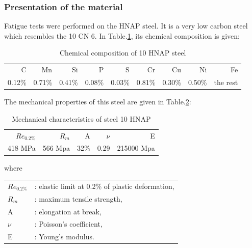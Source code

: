 \documentclass[3p,times,number,review]{elsarticle}
\begin{document}
\subsubsection{Presentation of the material}
Fatigue tests were performed on the HNAP steel. It is a very low carbon steel
which resembles the 10 CN 6. In Table.\ref{tab.10HNAPchem}, its chemical composition is given:	
\begin{table}[!h]
\centering
\begin{tabular}{rrrrrrrrr}
\hline
C      & Mn     & Si     & P      & S      & Cr     & Cu     & Ni     & Fe       \\
0.12\% & 0.71\% & 0.41\% & 0.08\% & 0.03\% & 0.81\% & 0.30\% & 0.50\% & the rest \\ \hline
\end{tabular}
\caption{Chemical composition of 10 HNAP steel\cite{Bedkowski1994}}
\label{tab.10HNAPchem}
\end{table}
The mechanical properties of this steel are given in Table.\ref{tab.10HNAPmec}:
\begin{table}[!h]
\centering
\begin{tabular}{rrrrr}
\hline
$Re_{0.2\%}$ & $R_m$   & A    & $\nu$ & E          \\
418 MPa     & 566 Mpa & 32\% & 0.29  & 215000 Mpa \\ \hline
\end{tabular}
\caption{Mechanical characteristics of steel 10 HNAP\cite{Bedkowski_1994}}
\label{tab.10HNAPmec}
\end{table}

where 
\begin{table}[!h]
\centering
\begin{tabular}{ll}
$Re_{0.2\%}$ & : elastic limit at 0.2\% of plastic deformation, \\
$R_m$      & : maximum tensile strength,                                                                  \\
A          & : elongation at break,                                                                       \\
$\nu$      & : Poisson's coefficient,                                                                     \\
E          & : Young's modulus.                                                                          
\end{tabular}
\end{table}
\end{document}
